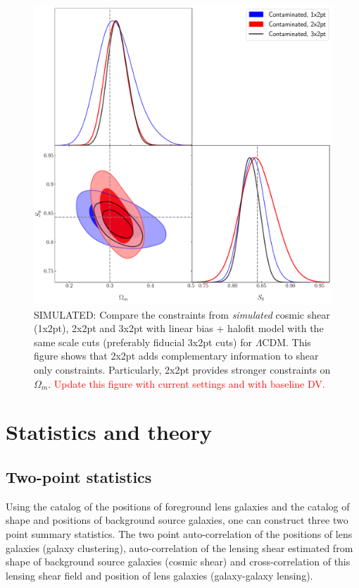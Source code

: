 \documentclass[fleqn,usenatbib]{mnras}
\newcommand{\red}[1]{\textcolor{red}{#1}}
\begin{document}
\begin{figure}
\includegraphics[width=\columnwidth]{figs/compare_all_cosmo_3x2pt_lcdm_contaminated.pdf}
\caption[]{SIMULATED: Compare the constraints from \textit{simulated} cosmic shear (1x2pt),  2x2pt and 3x2pt  with linear bias + halofit model with the same scale cuts (preferably fiducial 3x2pt cuts) for $\Lambda$CDM. This figure shows that 2x2pt adds complementary information to shear only constraints. Particularly, 2x2pt provides stronger constraints on $\Omega_m$. \red{Update this figure with current settings and with baseline DV.}}
\label{fig:all2pt_comp}
\end{figure}


\section{Statistics and theory}
\label{sec:stat_theory}
\subsection{Two-point statistics}
Using the catalog of the positions of foreground lens galaxies and the catalog of shape and positions of background source galaxies, one can construct three two point summary statistics. The two point auto-correlation of the positions of lens galaxies (galaxy clustering), auto-correlation of the lensing shear estimated from shape of background source galaxies (cosmic shear) and  cross-correlation of this lensing shear field and position of lens galaxies (galaxy-galaxy lensing). 
\end{document}
